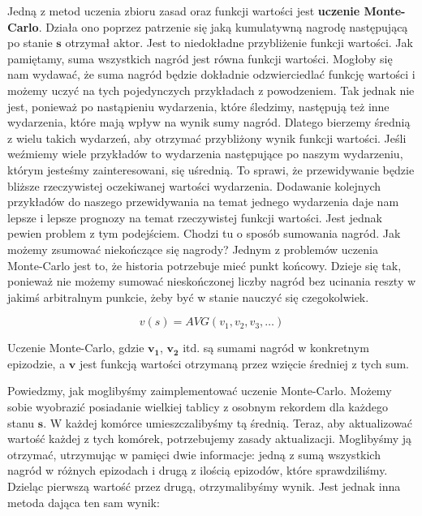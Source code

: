 Jedną z metod uczenia zbioru zasad oraz funkcji wartości jest \textbf{uczenie Monte-Carlo}. Działa ono poprzez patrzenie się jaką kumulatywną nagrodę następującą po stanie $\boldsymbol{s}$ otrzymał aktor. Jest to niedokładne przybliżenie funkcji wartości. Jak pamiętamy, suma wszystkich nagród jest równa funkcji wartości. Mogłoby się nam wydawać, że suma nagród będzie dokładnie odzwierciedlać funkcję wartości i możemy uczyć na tych pojedynczych przykładach z powodzeniem. Tak jednak nie jest, ponieważ po nastąpieniu wydarzenia, które śledzimy, następują też inne wydarzenia, które mają wpływ na wynik sumy nagród. Dlatego bierzemy średnią z wielu takich wydarzeń, aby otrzymać przybliżony wynik funkcji wartości. Jeśli weźmiemy wiele przykładów to wydarzenia następujące po naszym wydarzeniu, którym jesteśmy zainteresowani, się uśrednią. To sprawi, że przewidywanie będzie bliższe rzeczywistej oczekiwanej wartości wydarzenia. Dodawanie kolejnych przykładów do naszego przewidywania na temat jednego wydarzenia daje nam lepsze i lepsze prognozy na temat rzeczywistej funkcji wartości. Jest jednak pewien problem z tym podejściem. Chodzi tu o sposób sumowania nagród. Jak możemy zsumować niekończące się nagrody? Jednym z problemów uczenia Monte-Carlo jest to, że historia potrzebuje mieć punkt końcowy. Dzieje się tak, ponieważ nie możemy sumować nieskończonej liczby nagród bez ucinania reszty w jakimś arbitralnym punkcie, żeby być w stanie nauczyć się czegokolwiek.

\begin{equation}
v(s) = AVG(v_1, v_2, v_3, …)
\end{equation}

\noindent Uczenie Monte-Carlo, gdzie $\boldsymbol{v_1}$, $\boldsymbol{v_2}$ itd. są sumami nagród w konkretnym epizodzie, a $\boldsymbol{v}$ jest funkcją wartości otrzymaną przez wzięcie średniej z tych sum.\newline

Powiedzmy, jak moglibyśmy zaimplementować uczenie Monte-Carlo. Możemy sobie wyobrazić posiadanie wielkiej tablicy z osobnym rekordem dla każdego stanu $\boldsymbol{s}$. W każdej komórce umieszczalibyśmy tą średnią. Teraz, aby aktualizować wartość każdej z tych komórek, potrzebujemy zasady aktualizacji. Moglibyśmy ją otrzymać, utrzymując w pamięci dwie informacje: jedną z sumą wszystkich nagród w różnych epizodach i drugą z ilością epizodów, które sprawdziliśmy. Dzieląc pierwszą wartość przez drugą, otrzymalibyśmy wynik. Jest jednak inna metoda dająca ten sam wynik:

